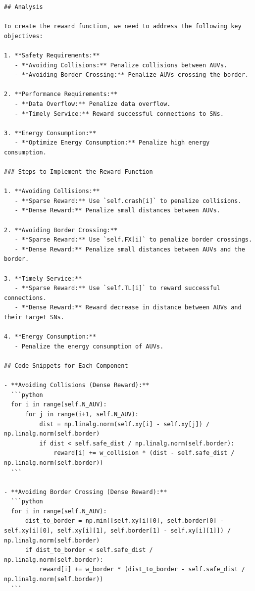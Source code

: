 \documentclass{article}
\begin{document}
\begin{verbatim}
## Analysis

To create the reward function, we need to address the following key objectives:

1. **Safety Requirements:**
   - **Avoiding Collisions:** Penalize collisions between AUVs.
   - **Avoiding Border Crossing:** Penalize AUVs crossing the border.

2. **Performance Requirements:**
   - **Data Overflow:** Penalize data overflow.
   - **Timely Service:** Reward successful connections to SNs.

3. **Energy Consumption:**
   - **Optimize Energy Consumption:** Penalize high energy consumption.

### Steps to Implement the Reward Function

1. **Avoiding Collisions:**
   - **Sparse Reward:** Use `self.crash[i]` to penalize collisions.
   - **Dense Reward:** Penalize small distances between AUVs.

2. **Avoiding Border Crossing:**
   - **Sparse Reward:** Use `self.FX[i]` to penalize border crossings.
   - **Dense Reward:** Penalize small distances between AUVs and the border.

3. **Timely Service:**
   - **Sparse Reward:** Use `self.TL[i]` to reward successful connections.
   - **Dense Reward:** Reward decrease in distance between AUVs and their target SNs.

4. **Energy Consumption:**
   - Penalize the energy consumption of AUVs.

## Code Snippets for Each Component

- **Avoiding Collisions (Dense Reward):**
  ```python
  for i in range(self.N_AUV):
      for j in range(i+1, self.N_AUV):
          dist = np.linalg.norm(self.xy[i] - self.xy[j]) / np.linalg.norm(self.border)
          if dist < self.safe_dist / np.linalg.norm(self.border):
              reward[i] += w_collision * (dist - self.safe_dist / np.linalg.norm(self.border))
  ```

- **Avoiding Border Crossing (Dense Reward):**
  ```python
  for i in range(self.N_AUV):
      dist_to_border = np.min([self.xy[i][0], self.border[0] - self.xy[i][0], self.xy[i][1], self.border[1] - self.xy[i][1]]) / np.linalg.norm(self.border)
      if dist_to_border < self.safe_dist / np.linalg.norm(self.border):
          reward[i] += w_border * (dist_to_border - self.safe_dist / np.linalg.norm(self.border))
  ```


\end{verbatim}
\end{document}
